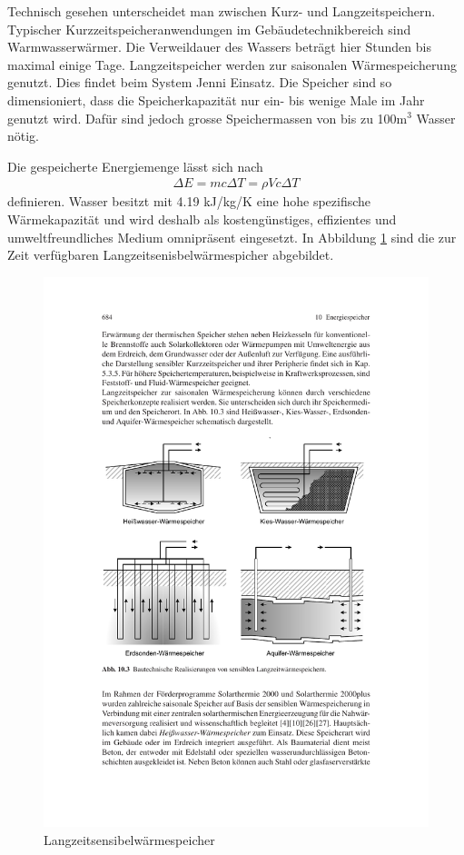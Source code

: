 \documentclass[11pt,a4paper]{scrartcl}
\begin{document}
Technisch gesehen unterscheidet man zwischen Kurz- und Langzeitspeichern.
Typischer Kurzzeitspeicheranwendungen im Gebäudetechnikbereich sind
Warmwasserwärmer. Die Verweildauer des Wassers beträgt hier Stunden bis maximal
einige Tage. Langzeitspeicher werden zur saisonalen Wärmespeicherung genutzt.
Dies findet beim \flqq System Jenni\frqq{} Einsatz. Die Speicher sind so
dimensioniert, dass die Speicherkapazität nur ein- bis wenige Male im Jahr
genutzt wird. Dafür sind jedoch grosse Speichermassen von bis zu 100m$^3$ Wasser
nötig.

Die gespeicherte Energiemenge lässt sich nach
\begin{align}
\Delta E = mc\Delta T = \rho Vc \Delta T
\end{align}
definieren. Wasser besitzt mit 4.19 kJ/kg/K eine hohe spezifische
Wärmekapazität und wird deshalb als kostengünstiges, effizientes und
umweltfreundliches Medium omnipräsent eingesetzt.
In Abbildung \ref{fig:Langzeitspeicher} sind die zur Zeit verfügbaren
Langzeitsenisbelwärmespicher abgebildet.

\begin{figure}[h]
\begin{center}
\includegraphics[scale=1]{images/langzeitspeicher.pdf}
\caption{Langzeitsensibelwärmespeicher \cite{Wesselak}}
\label{fig:Langzeitspeicher}
\end{center}
\end{figure}
\end{document}
